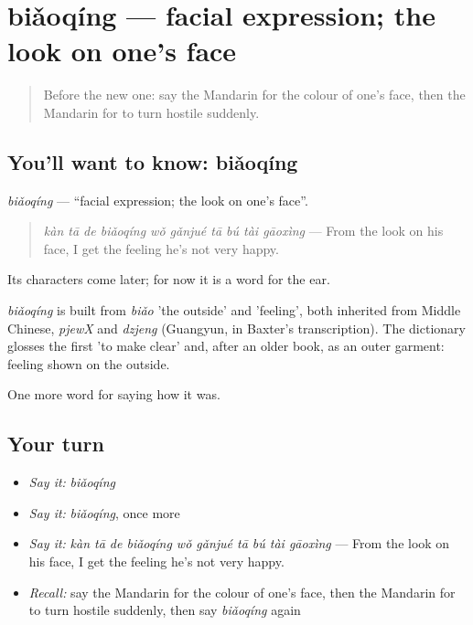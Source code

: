 \section[biǎoqíng]{biǎoqíng — facial expression; the look on one's face}

\label{lesson:ZH-C472-biaoqing}



\begin{quote}
Before the new one: say the Mandarin for the colour of one's face, then the Mandarin for to turn hostile suddenly.
\end{quote}

\subsection*{You'll want to know: biǎoqíng}
\emph{biǎoqíng} — \textquotedblleft{}facial expression; the look on one's face\textquotedblright{}.

\begin{quote}
\emph{kàn tā de biǎoqíng wǒ gǎnjué tā bú tài gāoxìng} — From the look on his face, I get the feeling he's not very happy.
\end{quote}

Its characters come later; for now it is a word for the ear.

\begin{cousinweb}
\emph{biǎoqíng} is built from \emph{biǎo} 'the outside' and  'feeling', both inherited from Middle Chinese, \emph{pjewX} and \emph{dzjeng} (Guangyun, in Baxter's transcription). The dictionary glosses the first 'to make clear' and, after an older book, as an outer garment: feeling shown on the outside.
\end{cousinweb}

\begin{grammarlens}[title={What you've built}]
One more word for saying how it was.
\end{grammarlens}

\subsection*{Your turn}
\begin{itemize}
\raggedright
  \item \emph{Say it:} \emph{biǎoqíng}
  \item \emph{Say it:} \emph{biǎoqíng}, once more
  \item \emph{Say it:} \emph{kàn tā de biǎoqíng wǒ gǎnjué tā bú tài gāoxìng} — From the look on his face, I get the feeling he's not very happy.
  \item \emph{Recall:} say the Mandarin for the colour of one's face, then the Mandarin for to turn hostile suddenly, then say \emph{biǎoqíng} again
\end{itemize}

